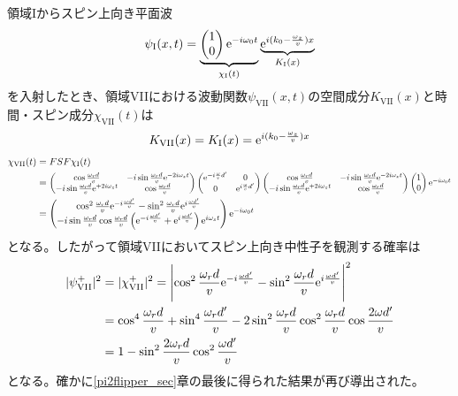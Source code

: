 領域Iからスピン上向き平面波
\begin{equation}
\psi_\mathrm{I}(x,t)=\underbrace{\begin{pmatrix} 1\\0\end{pmatrix} \mathrm{e}^{-i\omega_0t}}_{\chi_\mathrm{I}(t)} \underbrace{\mathrm{e}^{i (k_0-\frac{\omega_z}{v})x}}_{K_\mathrm{I}(x)}
\end{equation}
を入射したとき、領域VIIにおける波動関数$\psi_\mathrm{VII}(x,t)$の空間成分$K_\mathrm{VII}(x)$と時間・スピン成分$\chi_\mathrm{VII}(t)$は
\begin{align}
K_\mathrm{VII}(x)=K_\mathrm{I}(x)=\mathrm{e}^{i (k_0-\frac{\omega_z}{v})x}
\end{align}
\begin{align}
\chi_\mathrm{VII}(t)&=FSF\chi_\mathrm{I}(t) \notag \\
&=\scalebox{0.9}{$\begin{pmatrix} \cos \frac{\omega_r d}{v} &-i\sin\frac{\omega_rd}{v}\e^{-2i\omega_zt} \\ -i\sin\frac{\omega_rd}{v}\e^{+2i\omega_zt} &\cos \frac{\omega_r d}{v}\end{pmatrix}\begin{pmatrix} \e^{-i\frac{\omega}{v}d'} & 0\\0 &\e^{i\frac{\omega}{v}d'} \end{pmatrix}\begin{pmatrix} \cos \frac{\omega_r d}{v} &-i\sin\frac{\omega_rd}{v}\e^{-2i\omega_zt} \\ -i\sin\frac{\omega_rd}{v}\e^{+2i\omega_zt} &\cos \frac{\omega_r d}{v}\end{pmatrix} \begin{pmatrix} 1\\0\end{pmatrix} \e^{-i\omega_0t}$} \notag \\
&=\begin{pmatrix} \cos^2 \frac{\omega_r d}{v} \e^{-i\frac{\omega d'}{v}} -\sin^2 \frac{\omega_r d}{v} \e^{i\frac{\omega d'}{v}} \\ -i\sin\frac{\omega_r d}{v}\cos\frac{\omega_r d}{v}\left(\e^{-i\frac{\omega d'}{v}}+\e^{i\frac{\omega d'}{v}} \right) \e^{i\omega_s t} \end{pmatrix}\e^{-i\omega_0t}
\end{align}
となる。したがって領域VIIにおいてスピン上向き中性子を観測する確率は
\begin{align}
|\psi_\mathrm{VII}^+|^2&=|\chi_\mathrm{VII}^+|^2=\Biggl|\cos^2 \frac{\omega_r d}{v} \mathrm{e}^{-i\frac{\omega d'}{v}} -\sin^2 \frac{\omega_r d}{v} \mathrm{e}^{i\frac{\omega d'}{v}}\Biggr|^2\notag \\
&=\cos^4 \frac{\omega_r d}{v} +\sin^4 \frac{\omega_r d'}{v} -2\sin^2\frac{\omega_rd}{v}\cos^2\frac{\omega_rd}{v} \cos \frac{2\omega d'}{v} \notag \\
&=1-\sin^2 \frac{2\omega_r d}{v} \cos^2 \frac{\omega d'}{v}
\end{align}
となる。確かに\ref{pi2flipper_sec}章の最後に得られた結果が再び導出された。
\renewcommand{\arraystretch}{1}
\endgroup




